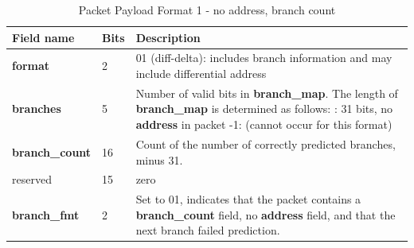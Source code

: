 \begin{table}[htp]
  \centering
  \caption{Packet Payload Format 1 - no address, branch count}
  \label{tab:te_inst0-1-noaddr-count}
  \begin{tabulary}{\textwidth}{|l|p{35mm}|p{80mm}|}
    \hline
    {\bf Field name} & {\bf Bits} & {\bf Description} \\
    \hline
    \textbf{format}	& 2	& 01 (diff-delta): includes branch information and may include differential address\\
    \hline
    \textbf{branches} & 5 & Number of valid bits in \textbf{branch\_map}. The length of \textbf{branch\_map} is determined as follows: :    31 bits, no \textbf{address} in packet -1: (cannot occur for this format) \\
    \hline
    \textbf{branch\_count} & 16 & Count of the number of correctly predicted branches, minus 31. \\
    \hline
    reserved & 15 & zero\\
    \hline
    \textbf{branch\_fmt} & 2 & Set to 01, indicates that the packet contains a \textbf{branch\_count} field, no
    \textbf{address} field, and that the next branch failed prediction. \\
    \hline
  \end{tabulary}
\end{table}

